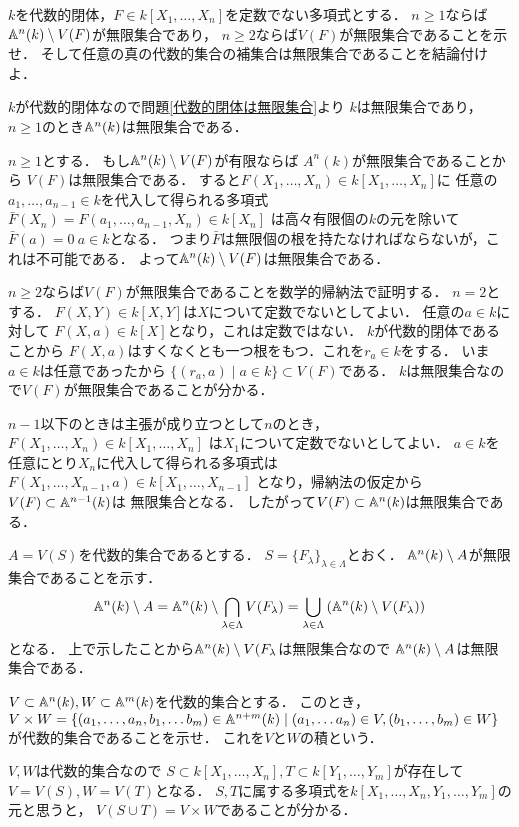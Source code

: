 \begin{prob}
  $k$を代数的閉体，$F\in k[X_1,\dots,X_n]$を定数でない多項式とする．
  $n\ge 1$ならば$\mathbb{A}^n(k) \setminus V(F)$が無限集合であり，
  $n\ge 2$ならば$V(F)$が無限集合であることを示せ．
  そして任意の真の代数的集合の補集合は無限集合であることを結論付けよ．
\end{prob}
\begin{ans}
  $k$が代数的閉体なので問題\ref{代数的閉体は無限集合}より
  $k$は無限集合であり，$n\ge 1$のとき$\mathbb{A}^n(k)$は無限集合である．
  
  $n\ge 1$とする．
  もし$\mathbb{A}^n(k) \setminus V(F)$が有限ならば
  $A^n(k)$が無限集合であることから
  $V(F)$は無限集合である．
  すると$F(X_1,\dots, X_n) \in k[X_1,\dots,X_n]$に
  任意の$a_1,\dots,a_{n-1} \in k$を代入して得られる多項式
  $\bar{F}(X_n) = F(a_1,\dots ,a_{n-1}, X_n) \in k[X_n]$
  は高々有限個の$k$の元を除いて$\bar{F}(a) = 0 \ a\in k$となる．
  つまり$\bar{F}$は無限個の根を持たなければならないが，これは不可能である．
  よって$\mathbb{A}^n(k) \setminus V(F)$は無限集合である．

  $n\ge 2$ならば$V(F)$が無限集合であることを数学的帰納法で証明する．
  $n = 2$とする．
  $F(X,Y) \in k[X,Y]$は$X$について定数でないとしてよい．
  任意の$a \in k$に対して
  $F(X,a) \in k[X]$となり，これは定数ではない．
  $k$が代数的閉体であることから
  $F(X,a)$はすくなくとも一つ根をもつ．これを$r_a \in k$をする．
  いま$a\in k$は任意であったから
  $ \{ (r_a, a) \mid a \in k \} \subset V(F) $である．
  $k$は無限集合なので$V(F)$が無限集合であることが分かる．
  
  $n-1$以下のときは主張が成り立つとして$n$のとき，
  $F(X_1, \dots, X_n) \in k[X_1,\dots,X_n]$
  は$X_1$について定数でないとしてよい．
  $a \in k$を任意にとり$X_n$に代入して得られる多項式は
  $F(X_1, \dots, X_{n-1}, a) \in k[X_1,\dots,X_{n-1}]$
  となり，帰納法の仮定から$V(F) \subset \mathbb{A}^{n-1}(k)$は
  無限集合となる．
  したがって$V(F) \subset \mathbb{A}^n(k)$は無限集合である．

  $A = V(S)$を代数的集合であるとする．
  $S = \{ F_{\lambda} \}_{\lambda\in\Lambda}$とおく．
  $\mathbb{A}^n(k) \setminus A$が無限集合であることを示す．
  \[ \mathbb{A}^n(k) \setminus A
  = \mathbb{A}^n(k) \setminus \bigcap_{\lambda\in\Lambda} V(F_{\lambda})
  = \bigcup_{\lambda\in\Lambda} \left( \mathbb{A}^n(k) \setminus V(F_{\lambda}) \right) \]
  となる．
  上で示したことから$\mathbb{A}^n(k) \setminus V(F_{\lambda}$は無限集合なので
  $ \mathbb{A}^n(k) \setminus A$は無限集合である．
\end{ans}

\begin{prob}
  $V \subset \mathbb{A}^{n}(k), W\subset \mathbb{A}^m(k)$を代数的集合とする．
  このとき，
  $V\times W = \{ (a_1, \dots, a_n, b_1, \dots b_m) \in \mathbb{A}^{n+m}(k) \mid (a_1, \dots a_n) \in V, (b_1, \dots, b_m) \in W \}$
  が代数的集合であることを示せ．
  これを$V$と$W$の積という．
\end{prob}
\begin{ans}
  $V,W$は代数的集合なので
  $S\subset k[X_1,\dots,X_n], T \subset k[Y_1, \dots, Y_m]$が存在して
  $V = V( S ), W = V( T )$となる．
  $S,T$に属する多項式を$k[X_1,\dots,X_n,Y_1,\dots,Y_m]$の元と思うと，
  $V(S \cup T) = V \times W$であることが分かる．
\end{ans}
